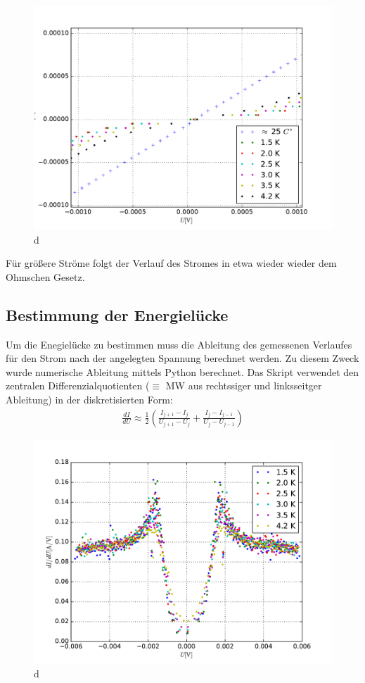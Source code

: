 \documentclass[twoside,        %
               BCOR12mm,       %
               english,ngerman, %
               fleqn,headsepline=false,footsepline=false
              ]{MFPREPORT}
\begin{document}
\begin{figure}
\includegraphics[scale=0.5]{2B.pdf}
\caption{d}
\label{fig:SLNLB}
\end{figure}

Für größere Ströme folgt der Verlauf des Stromes in etwa wieder wieder dem Ohmschen Gesetz.
\subsection{Bestimmung der Energielücke}

Um die Enegielücke zu bestimmen muss die Ableitung des gemessenen Verlaufes für den Strom nach der angelegten Spannung berechnet werden.
Zu diesem Zweck wurde numerische Ableitung mittels Python berechnet.
Das Skript verwendet den zentralen Differenzialquotienten
($\equiv$ MW aus rechtssiger und linksseitger Ableitung) in der diskretisierten Form:
\begin{align*}
\frac{d I}{d U} \approx \frac{1}{2} 
\left(
\frac{I_{j+1}-I_{j}}{U_{j+1}-U_{j}} 
+
\frac{I_{j}-I_{j-1}}{U_{j}-U_{j-1}}
\right)
\end{align*}

\begin{figure}
\includegraphics[scale=0.5]{3.pdf}
\caption{d}
\label{fig:SLNLDIF}
\end{figure}
\end{document}
